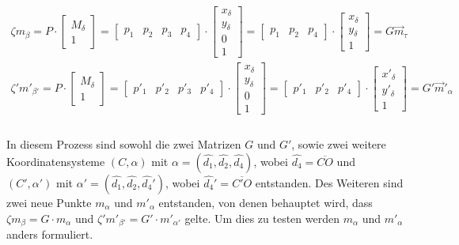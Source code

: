 \begin{gather}
\zeta m_\beta = P \cdot 
\begin{bmatrix}
	M_\delta\\1
\end{bmatrix} = 
\begin{bmatrix}
	p_1&p_2&p_3&p_4
\end{bmatrix} \cdot
\begin{bmatrix}
	x_\delta\\y_\delta\\0\\1
\end{bmatrix}=
\begin{bmatrix}
	p_1&p_2&p_4
\end{bmatrix} \cdot
\begin{bmatrix}
	x_\delta\\y_\delta\\1
\end{bmatrix}=
G \vec{m}_\tau\\
\zeta' m'_{\beta'} = P \cdot 
\begin{bmatrix}
	M_\delta\\1
\end{bmatrix} = 
\begin{bmatrix}
	p'_1&p'_2&p'_3&p'_4
\end{bmatrix} \cdot
\begin{bmatrix}
	x_\delta\\y_\delta\\0\\1
\end{bmatrix}=
\begin{bmatrix}
	p'_1&p'_2&p'_4
\end{bmatrix} \cdot
\begin{bmatrix}
	x'_\delta\\y'_\delta\\1
\end{bmatrix}=
G' \vec{m}'_{\alpha}\\
\end{gather}\\

In diesem Prozess sind sowohl die zwei Matrizen $G$ und $G'$, sowie zwei weitere Koordinatensysteme $(C,\alpha)$ mit $\alpha = (\hat{d_1},\hat{d_2},\hat{d_4})$, wobei $\hat{d_4} = \overline{CO}$ und  $(C',\alpha')$ mit $\alpha' = (\hat{d_1},\hat{d_2},\hat{d_4}')$, wobei $\hat{d_4}' = \overline{C'O}$ entstanden\cite{Elements}.
Des Weiteren sind zwei neue Punkte $m_\alpha$ und $m'_{\alpha}$ entstanden, von denen behauptet wird, dass $\zeta m_\beta = G\cdot m_\alpha$ und $\zeta' m'_{\beta'} = G'\cdot m'_{\alpha'}$ gelte\cite{Elements}. Um dies zu testen werden $m_\alpha$ und $m'_{\alpha}$ anders formuliert.

